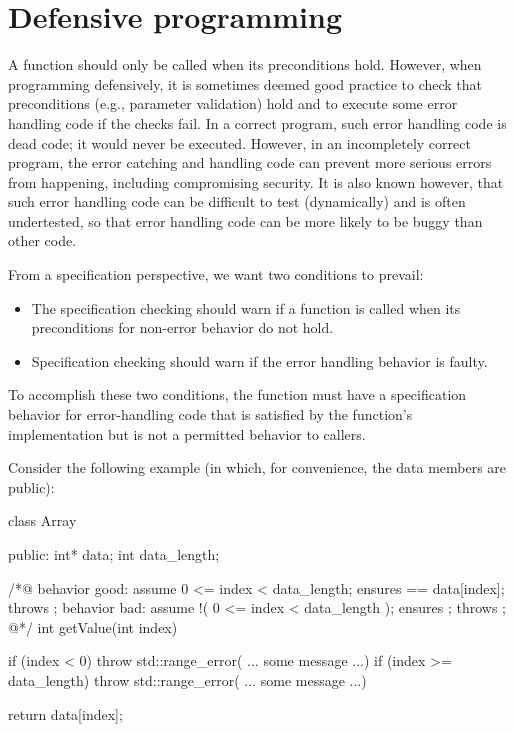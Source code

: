 \section{Defensive programming}
\label{sec:defensive}

A function should only be called when its preconditions 
hold. However, when programming defensively, it is sometimes deemed good practice to check that preconditions (e.g., parameter validation) 
hold and to execute some error handling code if the checks fail. In a correct program, such error handling code is dead code; it would
never be executed. However, in an incompletely correct program, the error catching and handling code can prevent more serious errors
from happening, including compromising security. It is also known however, that such error handling code can be difficult to test (dynamically) and is often undertested, so that error handling code can be more likely to be buggy than other code.\cite{Weimer:2004:FPR:1028976.1029011}

From a specification perspective, we want two conditions to prevail:
\begin{itemize}
	\item The specification checking should warn if a function is called when its preconditions for non-error behavior do not hold.
	\item Specification checking should warn if the error handling behavior is faulty.
\end{itemize}
To accomplish these two conditions, the function must have a specification behavior for error-handling code that is satisfied by the function's implementation but is not a permitted behavior to callers.

Consider the following example (in which, for convenience, the data members are public):

\begin{listing-nonumber}
class Array {
  public:
    int* data;
    int data_length;
    
    /*@ behavior good:
          assume 0 <= index < data_length;
          ensures \result == data[index];
          throws \false;
        behavior bad:
          assume !( 0 <= index < data_length );
          ensures \false;
          throws \true;
    @*/
    int getValue(int index) {
    	if (index < 0) throw std::range_error( ... some message ...)
    	if (index >= data_length) throw std::range_error( ... some message ...)
    	
    	return data[index];
    }
}
\end{listing-nonumber}

